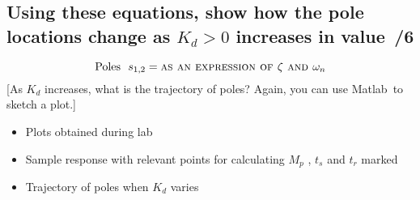 \documentclass{article}
\newcommand{\score}{\hfill \underline{\hspace{0.65cm}}\,/} %
\newcommand\RR{\textsuperscript{\textregistered}~} %
\begin{document}
\subsection{Using these equations, show how the pole locations change as $K_d >0$ increases in value \score 6}
\[
    \mbox{Poles}~~s_{1,2} = \mbox{\sc as an expression of $\zeta$ and $\omega_n$}
\]
[As $K_d$ increases, what is the trajectory of poles? Again, you can use {\sc Matlab}\RR to sketch a plot.]
\newline \\[3mm]
\begin{itemize}
\item Plots obtained during lab
\item Sample response with relevant points for calculating $M_p$ , $t_s$ and $t_r$ marked
\item Trajectory of poles when $K_d$ varies 
\end{itemize}
\end{document}
